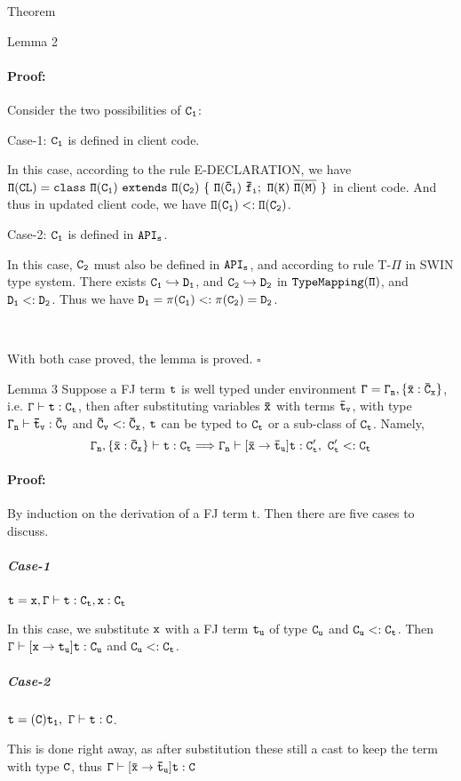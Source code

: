 \documentclass[GBK,winfonts,a4paper,11pt]{article}
\begin{document}
\begin{section}{Theorem}
\begin{subsection}{Lemma 2}
\paragraph{Proof:} Consider the two possibilities of $\tt C_1$:
\begin{subparagraph}{Case-1:} $\tt C_1$ is defined in client code. 
\par
In this case, according to the rule E-DECLARATION, we have $\tt \Pi(CL)= class\ \Pi(C_1)\ extends\ \Pi(C_2)\ \{\ \Pi(\bar{C}_i)\ \bar{f}_i;\ \Pi(K)\  \overline{\Pi(M)}\ \}$ in client code. And thus in updated client code, we have $\tt\Pi(C_1) <: \Pi(C_2)$.
\end{subparagraph}
\begin{subparagraph}{Case-2:} $\tt C_1$ is defined in $\tt API_s$.
\par
In this case, $\tt C_2$ must also be defined in $\tt API_s$, and according to rule T-$\Pi$ in SWIN type system. There exists $\tt C_1\hookrightarrow D_1$, and $\tt C_2\hookrightarrow D_2$ in $\tt TypeMapping(\Pi)$, and $\tt D_1 <: D_2$. Thus we have $\tt D_1=\pi(C_1) <: \pi(C_2)=D_2$.
\end{subparagraph}
\par \ 
\par
With both case proved, the lemma is proved. $\square$
\end{subsection}

\begin{subsection}{Lemma 3}
Suppose a FJ term $\tt t$ is well typed under environment $\tt \Gamma=\Gamma_n,\{\bar{x}:\bar{C}_x\}$, i.e. $\tt \Gamma\vdash t:C_t$, then after substituting variables $\tt \bar{x}$ with terms $\tt \bar{t}_v$, with type $\tt\Gamma_n\vdash\bar{t}_v:\bar{C}_v$ and $\tt\bar{C}_v <: \bar{C}_x$, $\tt t$ can be typed to $\tt C_t$ or a sub-class of $\tt C_t$. Namely,
$$\tt \Gamma_n,\{\bar{x}:\bar{C}_x\} \vdash t:C_t \Longrightarrow \Gamma_n\vdash [\bar{x}\rightarrow\bar{t}_u]t: C'_t,\ C'_t <: C_t$$
\paragraph{Proof:}
By induction on the derivation of a FJ term t. Then there are five cases to discuss.
\subparagraph{Case-1}$\tt t=x, \Gamma\vdash t:C_t, x:C_t$
\par
In this case, we substitute $\tt x$ with a FJ term $\tt t_u$ of type $\tt C_u$ and $\tt C_u<:C_t$. Then $\tt\Gamma\vdash [x\rightarrow t_u]t:C_u$ and $\tt C_u<:C_t$.

\subparagraph{Case-2}$\tt t=(C) t_1,\ \Gamma\vdash t:C$.
\par This is done right away, as after substitution these still a cast to keep the term with type $\tt C$, thus $\tt\Gamma \vdash [\bar{x}\rightarrow\bar{t}_u]t:C$


\end{subsection}
\end{section}
\end{document}
